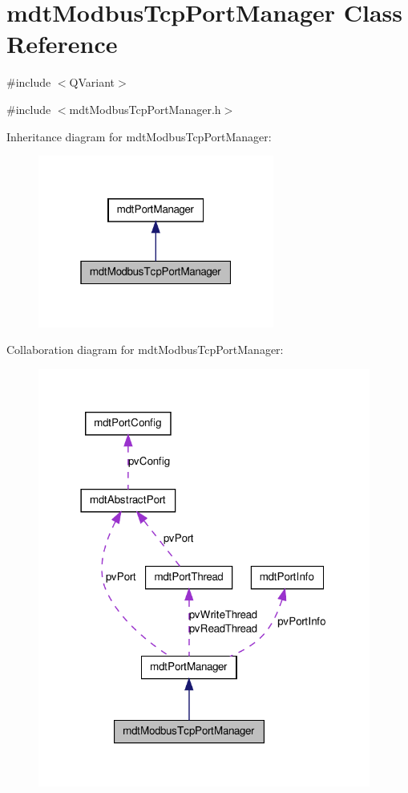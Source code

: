 \hypertarget{classmdt_modbus_tcp_port_manager}{
\section{mdtModbusTcpPortManager Class Reference}
\label{classmdt_modbus_tcp_port_manager}
}


\#include $<$QVariant$>$  




{\ttfamily \#include $<$mdtModbusTcpPortManager.h$>$}



Inheritance diagram for mdtModbusTcpPortManager:\nopagebreak
\begin{figure}[H]
\begin{center}
\leavevmode
\includegraphics[width=220pt]{classmdt_modbus_tcp_port_manager__inherit__graph}
\end{center}
\end{figure}


Collaboration diagram for mdtModbusTcpPortManager:\nopagebreak
\begin{figure}[H]
\begin{center}
\leavevmode
\includegraphics[width=310pt]{classmdt_modbus_tcp_port_manager__coll__graph}
\end{center}
\end{figure}
